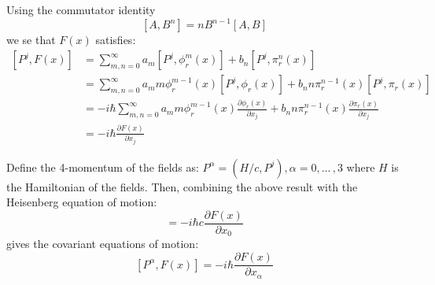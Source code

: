 \documentclass[letterpaper,12pt]{article}
\newenvironment{problem}{\subsection{}\begin{adjustwidth}{0.25in}{}\vspace{-\baselineskip}}{\end{adjustwidth}}
\newcommand{\pder}[2]{\frac{\partial #1}{\partial #2}}
\newcommand{\done}{\tag*{$\blacksquare$}}
\begin{document}
\begin{problem}
Using the commutator identity
\begin{equation*}
	\left[A, B^n\right] = nB^{n-1}\left[A,B\right]
\end{equation*}
we se that $F(x)$ satisfies:
\begin{align*}
	\left[P^j, F(x)\right] &= \sum_{m,n=0}^{\infty} a_m\left[P^j, \phi^m_r(x)\right] + b_n\left[P^j, \pi^n_r(x)\right]	\\
	&= \sum_{m,n=0}^{\infty} a_m m\phi^{m-1}_r(x) \left[P^j, \phi_r(x)\right] + b_n n\pi^{n-1}_r(x) \left[P^j, \pi_r(x)\right]		\\
	&= -i\hbar\sum_{m,n=0}^{\infty} a_m m\phi^{m-1}_r(x)\pder{\phi_r(x)}{x_j} + b_n n\pi^{n-1}_r(x)\pder{\pi_r(x)}{x_j}	\\
	&= -i\hbar \pder{F(x)}{x_j}		\done
\end{align*}

Define the 4-momentum of the fields as: $P^\alpha = (H/c, P^j), \alpha = 0, ... \,, 3$ where $H$ is the Hamiltonian of the fields. Then, combining the above result with the Heisenberg equation of motion:
\begin{equation*}
	[H, F(x)] = -i\hbar c \pder{F(x)}{x_0}
\end{equation*}
gives the covariant equations of motion:
\begin{equation*}
	\left[P^\alpha, F(x)\right] = -i\hbar \pder{F(x)}{x_\alpha}			\done
\end{equation*}
\end{problem}
\end{document}
